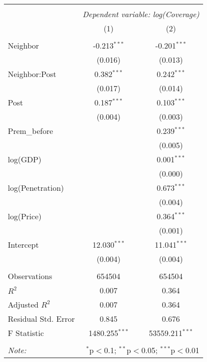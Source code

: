 
\begin{tabular}{@{\extracolsep{5pt}}lcc}
\\[-1.8ex]\hline
\hline \\[-1.8ex]
& \multicolumn{2}{c}{\textit{Dependent variable: log(Coverage)}} \
\cr \cline{2-3}
\\[-1.8ex] & (1) & (2) \\
\hline \\[-1.8ex]
 Neighbor & -0.213$^{***}$ & -0.201$^{***}$ \\
& (0.016) & (0.013) \\
 Neighbor:Post & 0.382$^{***}$ & 0.242$^{***}$ \\
& (0.017) & (0.014) \\
 Post & 0.187$^{***}$ & 0.103$^{***}$ \\
& (0.004) & (0.003) \\
 Prem\_before & & 0.239$^{***}$ \\
& & (0.005) \\
 log(GDP) & & 0.001$^{***}$ \\
& & (0.000) \\
 log(Penetration) & & 0.673$^{***}$ \\
& & (0.004) \\
 log(Price) & & 0.364$^{***}$ \\
& & (0.001) \\
Intercept & 12.030$^{***}$ & 11.041$^{***}$ \\
& (0.004) & (0.004) \\
\hline \\[-1.8ex]
 Observations & 654504 & 654504 \\
 $R^2$ & 0.007 & 0.364 \\
 Adjusted $R^2$ & 0.007 & 0.364 \\
 Residual Std. Error & 0.845  & 0.676  \\
 F Statistic & 1480.255$^{***}$  & 53559.211$^{***}$  \\
\hline
\hline \\[-1.8ex]
\textit{Note:} & \multicolumn{2}{r}{$^{*}$p$<$0.1; $^{**}$p$<$0.05; $^{***}$p$<$0.01} \\
\end{tabular}
